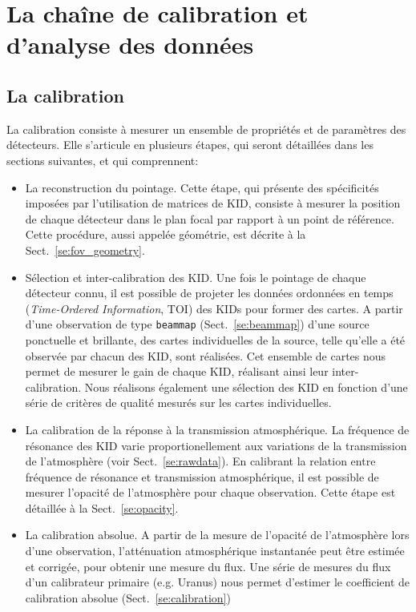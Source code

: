 
%
%
\section{La chaîne de calibration et d'analyse des données}
\label{se:pipeline}

\subsection{La calibration}

La calibration consiste à mesurer un ensemble de propriétés et de
paramètres des détecteurs. Elle s'articule en plusieurs étapes, qui
seront détaillées dans les sections suivantes, et qui comprennent:
\begin{itemize}
  \item{La reconstruction du pointage. Cette étape, qui présente
    des spécificités imposées par l'utilisation de matrices de KID,
    consiste à mesurer la position de chaque détecteur dans le plan
    focal par rapport à un point de référence. Cette procédure, aussi
    appelée géométrie, est décrite à la Sect.~\ref{se:fov_geometry}.}
  \item{Sélection et inter-calibration des KID. Une fois le pointage
    de chaque détecteur connu, il est possible de projeter les données
    ordonnées en temps (\emph{Time-Ordered Information}, TOI)} des KIDs
    pour former des cartes. A partir d'une observation de type
    {\tt beammap} (Sect.~\ref{se:beammap}) d'une source ponctuelle
    et brillante, des cartes individuelles de la source, telle qu'elle
    a été observée par chacun des KID, sont réalisées. Cet ensemble
    de cartes nous permet de mesurer le gain de chaque KID, réalisant
    ainsi leur inter-calibration. Nous réalisons également une
    sélection des KID en fonction d'une série de critères de qualité
    mesurés sur les cartes individuelles.
  \item{La calibration de la réponse à la transmission
    atmosphérique. La fréquence de résonance des KID varie
    proportionellement aux variations de la transmission de
    l'atmosphère (voir Sect.~\ref{se:rawdata}). En calibrant la
    relation entre
    fréquence de résonance et transmission atmosphérique, il est
    possible de mesurer l'opacité de l'atmosphère pour chaque
    observation. Cette étape est détaillée à la
    Sect.~\ref{se:opacity}.}
  \item{La calibration absolue. A partir de la mesure de l'opacité de
    l'atmosphère lors d'une observation, l'atténuation atmosphérique
    instantanée peut être estimée et corrigée, pour obtenir une mesure
    du flux. Une série de mesures du flux d'un calibrateur primaire
    (e.g. Uranus) nous permet d'estimer le coefficient de calibration
    absolue (Sect.~\ref{se:calibration})}
\end{itemize}

